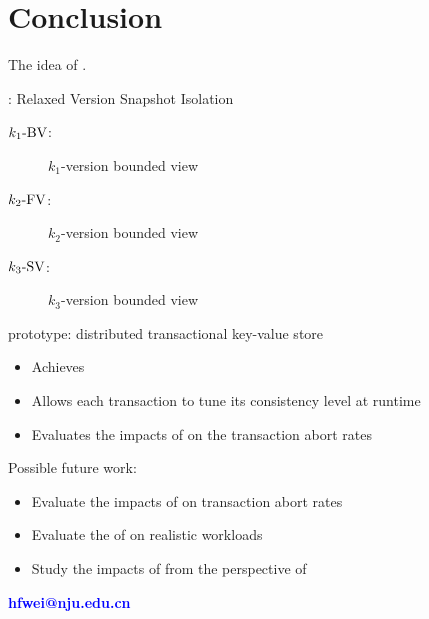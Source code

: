 \section{Conclusion}

\begin{frame}{}
  The idea of .

  \vspace{0.50cm}
  \rvsi{}: Relaxed Version Snapshot Isolation
  \begin{description}
    \item[$k_1\text{-BV}$:] $k_1$-version bounded \emph{} view
    \item[$k_2\text{-FV}$:] $k_2$-version bounded \emph{} view
    \item[$\kthreesv$:] $k_3$-version bounded \emph{} view
  \end{description}

  \vspace{10pt}
  \chameleon{} prototype: distributed transactional key-value store
  \begin{itemize}
    \item Achieves \rvsi{}
    \item Allows each transaction to tune its consistency level at runtime
    \item Evaluates the impacts of \rvsi{} on the transaction abort rates
  \end{itemize}
\end{frame}

\begin{frame}{}
  Possible future work:
  \begin{itemize}
    \item Evaluate the impacts of \blue{$\kthreesv$} on transaction abort rates
    \item Evaluate the  of \chameleon{} on realistic workloads
    \item Study the impacts of \rvsi{} from the perspective of 
  \end{itemize}
\end{frame}

\begin{frame}[noframenumbering]
  \vspace{-0.8cm}
  \begin{center}
    \textcolor{blue}{\bf \large hfwei@nju.edu.cn}
  \end{center}
  \vspace{-0.5cm}
\end{frame}
